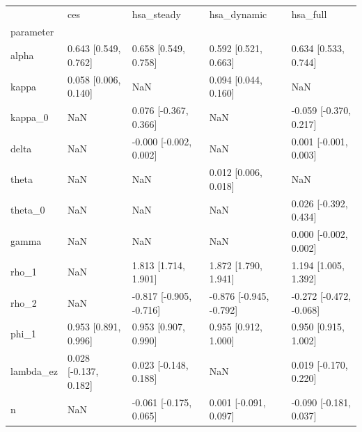 \begin{tabular}{lllll}
\toprule
 & ces & hsa\_steady & hsa\_dynamic & hsa\_full \\
parameter &  &  &  &  \\
\midrule
alpha & 0.643 [0.549, 0.762] & 0.658 [0.549, 0.758] & 0.592 [0.521, 0.663] & 0.634 [0.533, 0.744] \\
kappa & 0.058 [0.006, 0.140] & NaN & 0.094 [0.044, 0.160] & NaN \\
kappa\_0 & NaN & 0.076 [-0.367, 0.366] & NaN & -0.059 [-0.370, 0.217] \\
delta & NaN & -0.000 [-0.002, 0.002] & NaN & 0.001 [-0.001, 0.003] \\
theta & NaN & NaN & 0.012 [0.006, 0.018] & NaN \\
theta\_0 & NaN & NaN & NaN & 0.026 [-0.392, 0.434] \\
gamma & NaN & NaN & NaN & 0.000 [-0.002, 0.002] \\
rho\_1 & NaN & 1.813 [1.714, 1.901] & 1.872 [1.790, 1.941] & 1.194 [1.005, 1.392] \\
rho\_2 & NaN & -0.817 [-0.905, -0.716] & -0.876 [-0.945, -0.792] & -0.272 [-0.472, -0.068] \\
phi\_1 & 0.953 [0.891, 0.996] & 0.953 [0.907, 0.990] & 0.955 [0.912, 1.000] & 0.950 [0.915, 1.002] \\
lambda\_ez & 0.028 [-0.137, 0.182] & 0.023 [-0.148, 0.188] & NaN & 0.019 [-0.170, 0.220] \\
n & NaN & -0.061 [-0.175, 0.065] & 0.001 [-0.091, 0.097] & -0.090 [-0.181, 0.037] \\
\bottomrule
\end{tabular}
